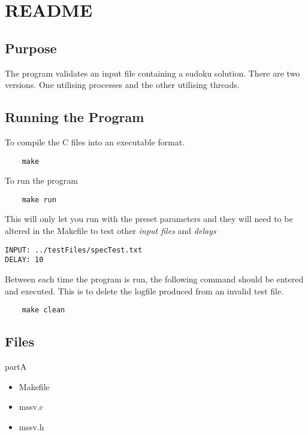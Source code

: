 \documentclass[]{article}
\begin{document}
\section{README}



\subsection{Purpose}
The program validates an input file containing a sudoku solution. There are two versions. One utilising processes and the other utilising threads.

\subsection{Running the Program}
To compile the C files into an executable format.

\begin{lstlisting}
	make
\end{lstlisting}

To run the program \\


\begin{lstlisting}
	make run 
\end{lstlisting}

This will only let you run with the preset parameters and they will need to be altered in the Makefile to test other \textit{input files} and \textit{delays} \\


\begin{lstlisting}
INPUT: ../testFiles/specTest.txt
DELAY: 10
\end{lstlisting}

Between each time the program is run, the following command should be entered and executed. This is to delete the logfile produced from an invalid test file.

\begin{lstlisting}
	make clean
\end{lstlisting}

\subsection{Files}
partA
\begin{itemize}
	\item Makefile
	\item mssv.c
	\item mssv.h
\end{itemize}
\end{document}
